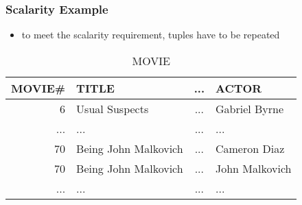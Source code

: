 \documentclass[dvipsnames]{beamer}
\theoremstyle{plain}
\begin{document}
\begin{frame}
  \frametitle{Scalarity Example}

  \begin{itemize}
    \item to meet the scalarity requirement, tuples have to be repeated
  \end{itemize}

  \begin{footnotesize}
  \begin{table}
    \caption{MOVIE}
    \begin{tabular}{|r|l|c|l|}\hline
MOVIE\# & TITLE                & ... & ACTOR         \\\hline\hline
      6 & Usual Suspects       & ... & Gabriel Byrne \\\hline
    ... & ...                  & ... & ...           \\\hline
     70 & Being John Malkovich & ... & Cameron Diaz  \\\hline
     70 & Being John Malkovich & ... & John Malkovich\\\hline
    ... & ...                  & ... & ...           \\\hline
    \end{tabular}
  \end{table}
  \end{footnotesize}
\end{frame}
\end{document}
